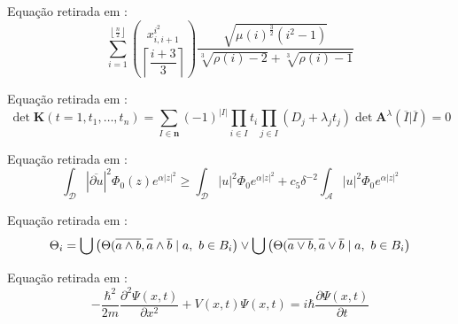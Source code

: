 \begin{prob}
\label{prob8}
Equação retirada em \cite{gratzer2007more}:
\begin{equation*}
    \sum\limits_{i=1}^{\left\lfloor \frac{n}{2} \right\rfloor} \binom{x_{i,i+1}^{i^{2}}}{\left\lceil \dfrac{i+3}{3} \right\rceil}\frac{\sqrt{\mu (i)^{\frac{3}{2}}(i^{2}-1)}}{\sqrt[3]{\rho (i)-2}+\sqrt[3]{\rho (i)-1}}
\end{equation*}
\end{prob}

\begin{prob}
\label{prob9}
Equação retirada em \cite{gratzer2007more}:
\begin{equation*}
    \det \mathbf{K}(t = 1, t_1,\dots,t_n) = \sum\limits_{I\in\mathbf{n}}(-1)^{|I|}\prod\limits_{i\in I} t_{i}\prod\limits_{j\in I} (D_{j} + \lambda_{j}t_{j}) \det \mathbf{A}^{\lambda}(\overline{I} | \overline{I}) = 0
\end{equation*}
\end{prob}

\begin{prob}
\label{prob10}
Equação retirada em \cite{gratzer2007more}:
\begin{equation*}
    \int_{\mathcal{D}} |\overline{\partial u}|^{2} \Phi_{0}(z) e^{\alpha |z|^{2}} \ge \int_{\mathcal{D}} |u|^2 \Phi_{0}e^{\alpha |z|^{2}} + c_{5}\delta^{-2} \int_{\mathcal{A}} |u|^2 \Phi_{0}e^{\alpha |z|^{2}}
\end{equation*}
\end{prob}

\begin{prob}
\label{prob11}
Equação retirada em \cite{gratzer2007more}:
\begin{equation*}
    \Theta_{i} = \bigcup \big( \Theta (\overline{a \wedge b}, \overline{\vphantom{b}a}\wedge \overline{b} \mid a,\ b \in B_{i} \big) \vee \bigcup \big( \Theta (\overline{a \vee b}, \overline{\vphantom{b}a}\vee \overline{b} \mid a,\ b \in B_{i} \big)
\end{equation*}
\end{prob}

\begin{prob}
\label{prob12}
Equação retirada em \cite{Tiago}:
\begin{equation*}
     -\frac{\hbar^{2}}{2 m}\frac{\partial^{2}\Psi(x,t)}{\partial x^2} + V(x,t)\Psi(x,t)=i\hbar\frac{\partial\Psi(x,t)}{\partial t}
\end{equation*}
\end{prob}

